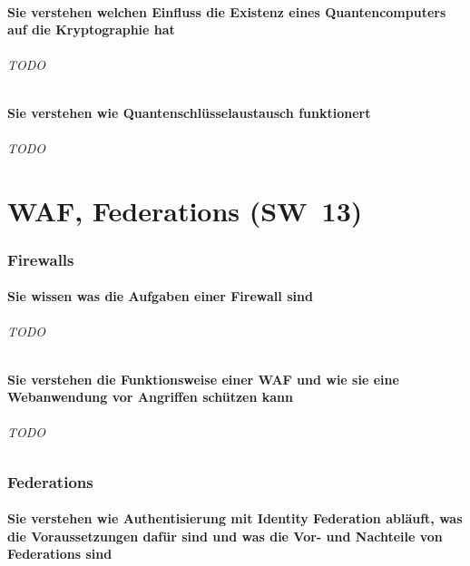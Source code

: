 \documentclass[10pt,a4paper]{article}
\begin{document}
\subsection*{Sie verstehen welchen Einfluss die Existenz eines Quantencomputers auf die Kryptographie hat}
\paragraph*{TODO}
\subsection*{Sie verstehen wie Quantenschlüsselaustausch funktionert}
\paragraph*{TODO}
\part{WAF, Federations (SW~13)}
\section{Firewalls}
\subsection*{Sie wissen was die Aufgaben einer Firewall sind}
\paragraph*{TODO}
\subsection*{Sie verstehen die Funktionsweise einer WAF und wie sie eine Webanwendung vor Angriffen schützen kann}
\paragraph*{TODO}


\section{Federations}
\subsection*{Sie verstehen wie Authentisierung mit Identity Federation abläuft, was die Voraussetzungen dafür sind und was die Vor- und Nachteile von Federations sind}
\end{document}
